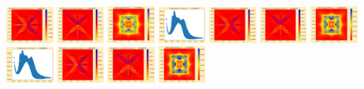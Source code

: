 \documentclass[11pt]{article}
\begin{document}
\includegraphics[width=0.11875\textwidth]{frame0054fig2.png}
\includegraphics[width=0.11875\textwidth]{frame0054fig3.png}
\includegraphics[width=0.11875\textwidth]{frame0055fig0.png}
\includegraphics[width=0.11875\textwidth]{frame0055fig1.png}
\includegraphics[width=0.11875\textwidth]{frame0055fig2.png}
\includegraphics[width=0.11875\textwidth]{frame0055fig3.png}
\vskip 10pt 
\includegraphics[width=0.11875\textwidth]{frame0056fig0.png}
\includegraphics[width=0.11875\textwidth]{frame0056fig1.png}
\includegraphics[width=0.11875\textwidth]{frame0056fig2.png}
\includegraphics[width=0.11875\textwidth]{frame0056fig3.png}
\includegraphics[width=0.11875\textwidth]{frame0057fig0.png}
\end{document}
